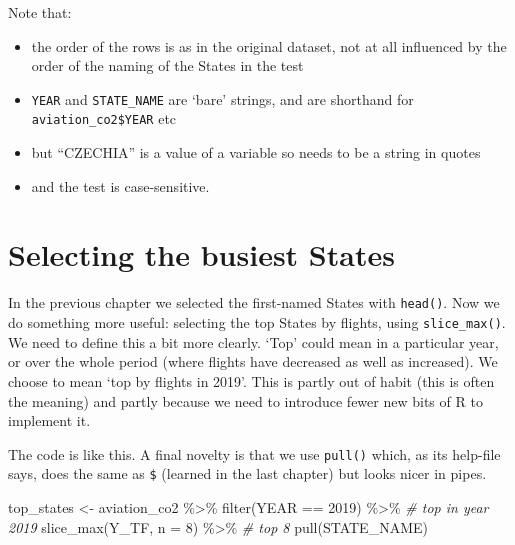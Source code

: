 \documentclass[
]{book}
\newenvironment{Shaded}{\begin{snugshade}}{\end{snugshade}}
\newcommand{\AttributeTok}[1]{\textcolor[rgb]{0.77,0.63,0.00}{#1}}
\newcommand{\CommentTok}[1]{\textcolor[rgb]{0.56,0.35,0.01}{\textit{#1}}}
\newcommand{\DecValTok}[1]{\textcolor[rgb]{0.00,0.00,0.81}{#1}}
\newcommand{\FunctionTok}[1]{\textcolor[rgb]{0.00,0.00,0.00}{#1}}
\newcommand{\NormalTok}[1]{#1}
\newcommand{\OtherTok}[1]{\textcolor[rgb]{0.56,0.35,0.01}{#1}}
\newcommand{\SpecialCharTok}[1]{\textcolor[rgb]{0.00,0.00,0.00}{#1}}
\providecommand{\tightlist}{%
  \setlength{\itemsep}{0pt}\setlength{\parskip}{0pt}}
\begin{document}
Note that:

\begin{itemize}
\tightlist
\item
  the order of the rows is as in the original dataset, not at all influenced by the order of the naming of the States in the test
\item
  \texttt{YEAR} and \texttt{STATE\_NAME} are `bare' strings, and are shorthand for \texttt{aviation\_co2\$YEAR} etc
\item
  but ``CZECHIA'' is a value of a variable so needs to be a string in quotes
\item
  and the test is case-sensitive.
\end{itemize}

\hypertarget{selecting-the-busiest-states}{%
\section{Selecting the busiest States}\label{selecting-the-busiest-states}}

In the previous chapter we selected the first-named States with \texttt{head()}. Now we do something more useful: selecting the top States by flights, using \texttt{slice\_max()}. We need to define this a bit more clearly. `Top' could mean in a particular year, or over the whole period (where flights have decreased as well as increased). We choose to mean `top by flights in 2019'. This is partly out of habit (this is often the meaning) and partly because we need to introduce fewer new bits of R to implement it.

The code is like this. A final novelty is that we use \texttt{pull()} which, as its help-file says, does the same as \texttt{\$} (learned in the last chapter) but looks nicer in pipes.

\begin{Shaded}
\begin{Highlighting}[]
\NormalTok{top\_states }\OtherTok{\textless{}{-}}\NormalTok{ aviation\_co2 }\SpecialCharTok{\%\textgreater{}\%} 
  \FunctionTok{filter}\NormalTok{(YEAR }\SpecialCharTok{==} \DecValTok{2019}\NormalTok{) }\SpecialCharTok{\%\textgreater{}\%}     \CommentTok{\# top in year 2019}
  \FunctionTok{slice\_max}\NormalTok{(Y\_TF, }\AttributeTok{n =} \DecValTok{8}\NormalTok{) }\SpecialCharTok{\%\textgreater{}\%}  \CommentTok{\# top 8 }
  \FunctionTok{pull}\NormalTok{(STATE\_NAME) }
\end{Highlighting}
\end{Shaded}
\end{document}
